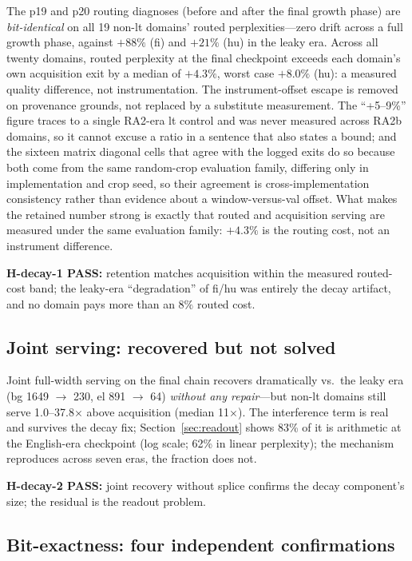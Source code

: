 \documentclass[11pt]{article}
\theoremstyle{definition}\newtheorem{definition}{Definition}
\theoremstyle{remark}\newtheorem{remark}{Remark}
\begin{document}
The p19 and p20 routing diagnoses (before and after the final growth phase) are
\emph{bit-identical} on all 19 non-lt domains' routed perplexities---zero drift across a
full growth phase, against $+88\%$ (fi) and $+21\%$ (hu) in the leaky era. Across all
twenty domains, routed perplexity at the final checkpoint exceeds each domain's own
acquisition exit by a median of $+4.3\%$, worst case $+8.0\%$ (hu): a measured quality
difference, not instrumentation. The instrument-offset escape is removed on provenance
grounds, not replaced by a substitute measurement. The ``+5--9\%'' figure traces to a
single RA2-era lt control and was never measured across RA2b domains, so it cannot excuse
a ratio in a sentence that also states a bound; and the sixteen matrix diagonal cells that
agree with the logged exits do so because both come from the same random-crop evaluation
family, differing only in implementation and crop seed, so their agreement is
cross-implementation consistency rather than evidence about a window-versus-val offset.
What makes the retained number strong is exactly that routed and acquisition serving are
measured under the same evaluation family: $+4.3\%$ is the routing cost, not an instrument
difference.

\textbf{H-decay-1 PASS:} retention matches acquisition within the measured routed-cost
band; the leaky-era ``degradation'' of fi/hu was entirely the decay artifact, and no
domain pays more than an $8\%$ routed cost.

\subsection{Joint serving: recovered but not solved}

Joint full-width serving on the final chain recovers dramatically vs.\ the leaky era
(bg 1649 $\to$ 230, el 891 $\to$ 64) \emph{without any repair}---but non-lt domains still
serve 1.0--37.8$\times$ above acquisition (median 11$\times$). The interference term is real and survives the
decay fix; Section~\ref{sec:readout} shows 83\% of it is arithmetic at the English-era checkpoint (log scale; 62\% in linear perplexity); the mechanism reproduces across seven eras, the fraction does not.

\textbf{H-decay-2 PASS:} joint recovery without splice confirms the decay component's
size; the residual is the readout problem.

\subsection{Bit-exactness: four independent confirmations}
\end{document}
